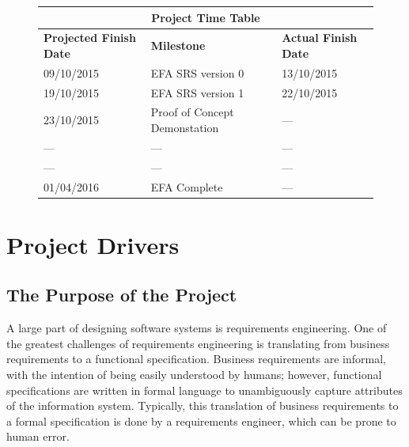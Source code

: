 \documentclass[12pt]{report}
\begin{document}
\newpage

\tableofcontents
\listoffigures
\listoftables

\newpage
{} %

\setlength{\arrayrulewidth}{0.35mm}
\setlength{\tabcolsep}{16pt}
\renewcommand{\arraystretch}{2}
\begin{figure}
	\begin{adjustwidth}{-1cm}{}
	\begin{tabular}{ |m{4cm}|m{6cm}|m{4cm}|  }
		\hline
		\multicolumn{3}{|c|}{\bfseries{Project Time Table}} \\
		\hline
		\bfseries{Projected Finish Date}& \bfseries{Milestone} & 
		\bfseries{Actual Finish Date} \\
		\hline
		 09/10/2015& EFA SRS version 0 & 13/10/2015 \\
		19/10/2015 & EFA SRS version 1  & 22/10/2015 \\
		23/10/2015 & Proof of Concept Demonstation & --- \\
		---    & --- & --- \\
		--- & --- & --- \\
		01/04/2016 & EFA Complete & --- \\
		\hline
	\end{tabular}
	\end{adjustwidth}
\end{figure}
\chapter{Project Drivers}\label{ch:Intro}
{\section{The Purpose of the Project}\label{sec:Purpose}}
A large part of designing software systems is requirements engineering. One
of the greatest challenges of requirements engineering is translating from
business requirements to a functional specification. Business requirements are
informal, with the intention of being easily understood by humans; however,
functional specifications are written in formal language to unambiguously capture attributes of the 
information system. Typically, this translation
of business requirements to a formal specification is done by a requirements
engineer, which can be prone to human error.
\end{document}

